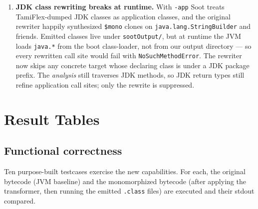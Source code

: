 \documentclass[11pt,a4paper]{article}
\begin{document}
\begin{enumerate}[topsep=2pt,itemsep=2pt]
  \item \textbf{JDK class rewriting breaks at runtime.} With \texttt{-app}
    Soot treats TamiFlex-dumped JDK classes as application classes, and
    the original rewriter happily synthesized \texttt{\$mono} clones on
    \texttt{java.lang.StringBuilder} and friends. Emitted classes live
    under \texttt{sootOutput/}, but at runtime the JVM loads
    \texttt{java.*} from the boot class-loader, not from our output
    directory --- so every rewritten call site would fail with
    \texttt{NoSuchMethodError}. The rewriter now skips any concrete
    target whose declaring class is under a JDK package prefix. The
    \emph{analysis} still traverses JDK methods, so JDK return types
    still refine application call sites; only the rewrite is suppressed.
\end{enumerate}

\section{Result Tables}

\subsection{Functional correctness}

Ten purpose-built testcases exercise the new capabilities. For each, the
original bytecode (JVM baseline) and the monomorphized bytecode (after
applying the transformer, then running the emitted \texttt{.class}
files) are executed and their stdout compared.
\end{document}
